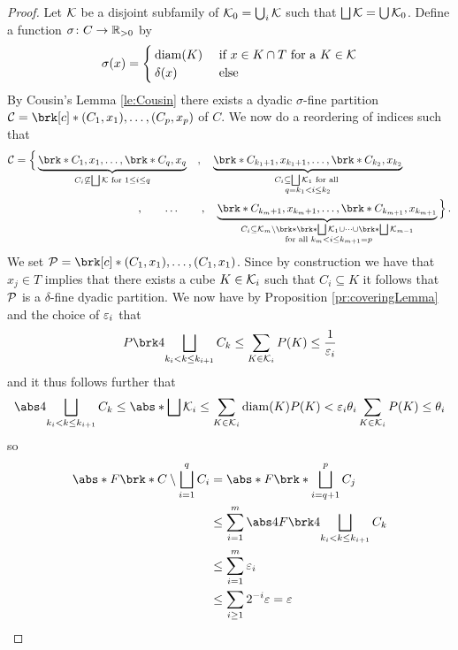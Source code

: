 \begin{proof}
Let $\mathcal{K}$ be a disjoint subfamily of $\mathcal{K}_0=\bigcup_i\mathcal{K}$ such that $\bigsqcup\mathcal{K}=\bigcup\mathcal{K}_0$. Define a function $\sigma\colon C\to \mathbb{R}_{>0}$ by
\begin{align*}
	\sigma(x)=\begin{cases}
		\operatorname{diam}(K)&\text{ if }x\in K\cap T\text{ for a }K\in\mathcal{K}\\
		\delta(x) &\text{ else}
	\end{cases}
\end{align*}
By Cousin's Lemma \ref{le:Cousin} there exists a dyadic $\sigma$-fine partition $\cC=\brk[c]*{(C_1,x_1),\dots,(C_p,x_p)}$ of $C$.
 We now do a reordering of indices such that
\begin{align*}
	\cC=\Big\{\underbrace{\brk*{C_1,x_1},\dots,\brk*{C_q,x_q}}_{C_i\not\subseteq\bigsqcup\cK\text{ for }1\leq i\leq q}\quad,\quad \underbrace{\brk*{C_{k_1+1},x_{k_1+1}},\dots,\brk*{C_{k_2},x_{k_2}}}_{\substack{C_i\subseteq \bigsqcup\cK_1 \text{ for all } \\ q=k_1< i\leq k_2}}\qquad\qquad&\\
	\qquad\qquad,\qquad\dots\qquad,\quad \underbrace{\brk*{C_{k_m+1},x_{k_m+1}},\dots,\brk*{C_{k_{m+1}},x_{k_{m+1}}}}_{\substack{C_i\subseteq \cK_m\setminus \brk*{\brk*{\bigsqcup\cK_1}\cup\dots\cup\brk*{\bigsqcup\cK_{m-1}}}\\ \text{ for all }  k_m< i\leq k_{m+1}=p}}\Big\}&\,.
\end{align*}
We set $\cP=\brk[c]*{(C_1,x_1),\dots,(C_1,x_1)}$. Since by construction we have that $x_j\in T$ implies that there exists a cube $K\in\mathcal{K}_i$ such that $C_i\subseteq K$ it follows that $\mathcal{P}$ is a $\delta$-fine dyadic partition.
We now have by Proposition \ref{pr:coveringLemma} and the choice of $\varepsilon_i$ that
\begin{align*}
	P\brk4{\bigsqcup_{k_i<k\leq k_{i+1}}C_k}
	\leq \sum_{K\in\cK_i}P(K)
	\leq \frac{1}{\e_i}
\end{align*}
and it thus follows further that
\begin{align*}
	\abs4{\bigsqcup_{k_i<k\leq k_{i+1}}C_k}
	\leq \abs*{\bigsqcup\cK_i}
	\leq \sum_{K\in\cK_i}\diam(K)P(K)
	<\e_i\theta_i\sum_{K\in\cK_i}P(K)\leq \theta_i
\end{align*}
so
\begin{align*}
	\abs*{F\brk*{C\setminus\bigsqcup_{i=1}^q C_i}}
	&=\abs*{F\brk*{\bigsqcup_{i=q+1}^p C_j}} \\
	&\leq \sum_{i=1}^m\abs4{F\brk4{\bigsqcup_{k_i<k\leq k_{i+1}}C_k}} \\
	&\leq \sum_{i=1}^m\e_i \\
	&\leq \sum_{i\geq 1}2^{-i}\e=\e
\end{align*}
\end{proof}


